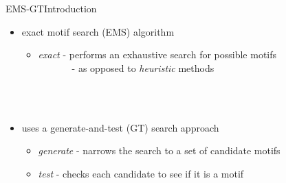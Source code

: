 \documentclass[pdf,xcolor={dvipsnames}]{beamer}
\begin{document}
\begin{frame}{EMS-GT}{Introduction}
	\begin{itemize}
		\item {\color{red}exact motif search} (EMS) algorithm\\\vspace*{6pt}
		\begin{itemize}\normalsize
			\item {\em exact} - performs an {exhaustive search} for possible motifs\\\vspace*{6pt}
			\ \ \ \ \ \ \ - as opposed to {\em heuristic} methods
			\end{itemize}
		\ \\\ \\
		\item uses a {\color{red}generate-and-test} (GT) search approach\\\vspace*{6pt}
		\begin{itemize}\normalsize
			\item {\em generate} - narrows the search to a {set of candidate motifs}\\\vspace*{6pt}
			\item {\em test} - {checks each candidate} to see if it is a motif
			\end{itemize}
		\end{itemize}
	\end{frame}
\end{document}
